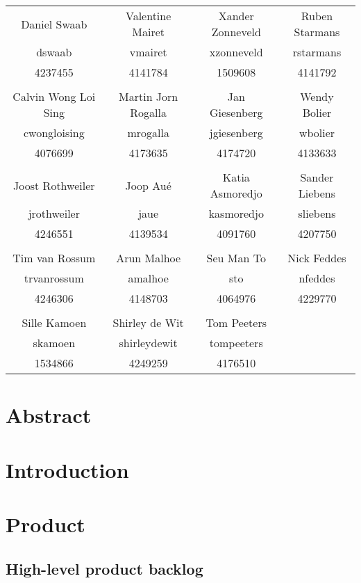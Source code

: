 \documentclass{article}
\begin{document}
{\makecover
\maketitle
\begin{tabular}{cccc}
Daniel Swaab & Valentine Mairet & Xander Zonneveld & Ruben Starmans\\
dswaab & vmairet & xzonneveld & rstarmans\\
4237455 & 4141784 & 1509608 & 4141792\\
&&&\\
Calvin Wong Loi Sing & Martin Jorn Rogalla & Jan Giesenberg & Wendy Bolier\\
cwongloising & mrogalla & jgiesenberg & wbolier\\
4076699 & 4173635 & 4174720 & 4133633\\
&&&\\
Joost Rothweiler & Joop Au\'{e} & Katia Asmoredjo & Sander Liebens\\
jrothweiler & jaue & kasmoredjo & sliebens\\
4246551 & 4139534 & 4091760 & 4207750\\
&&&\\
Tim van Rossum & Arun Malhoe & Seu Man To & Nick Feddes\\
trvanrossum & amalhoe & sto & nfeddes\\
4246306 & 4148703 & 4064976 & 4229770\\
&&&\\
Sille Kamoen & Shirley de Wit & Tom Peeters &\\
skamoen & shirleydewit & tompeeters &\\
1534866 & 4249259 & 4176510 &
\end{tabular}
\pagebreak
\section*{Abstract}

\pagebreak
\tableofcontents
\pagebreak
\section{Introduction}


\section{Product}
\subsection{High-level product backlog}
}
\end{document}
